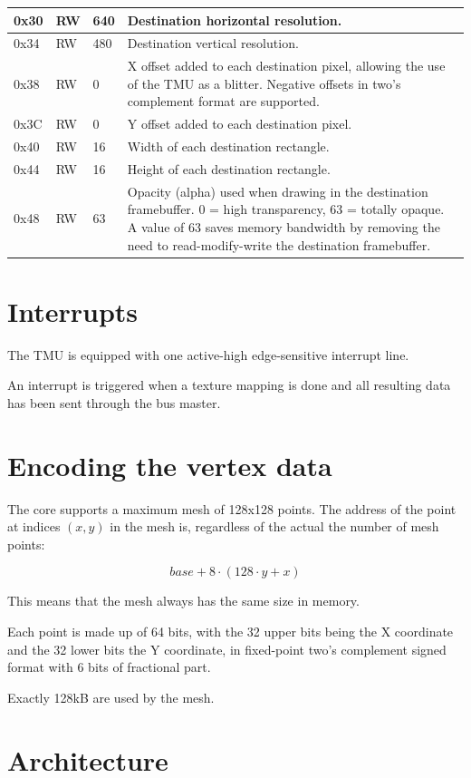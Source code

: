 \documentclass[a4paper,11pt]{article}
\begin{document}
\begin{tabularx}{\textwidth}{|l|l|l|X|}
\hline
0x30 & RW & 640 & Destination horizontal resolution. \\
\hline
0x34 & RW & 480 & Destination vertical resolution. \\
\hline
0x38 & RW & 0 & X offset added to each destination pixel, allowing the use of the TMU as a blitter. Negative offsets in two's complement format are supported. \\
\hline
0x3C & RW & 0 & Y offset added to each destination pixel. \\
\hline
0x40 & RW & 16 & Width of each destination rectangle. \\
\hline
0x44 & RW & 16 & Height of each destination rectangle. \\
\hline
0x48 & RW & 63 & Opacity (alpha) used when drawing in the destination framebuffer. 0 = high transparency, 63 = totally opaque. A value of 63 saves memory bandwidth by removing the need to read-modify-write the destination framebuffer. \\
\hline
\end{tabularx}

\section{Interrupts}
The TMU is equipped with one active-high edge-sensitive interrupt line.

An interrupt is triggered when a texture mapping is done and all resulting data has been sent through the bus master.

\section{Encoding the vertex data}
The core supports a maximum mesh of 128x128 points. The address of the point at indices $ (x, y) $ in the mesh is, regardless of the actual the number of mesh points:

\begin{equation*}
base + 8 \cdot (128 \cdot y + x)
\end{equation*}

This means that the mesh always has the same size in memory.

Each point is made up of 64 bits, with the 32 upper bits being the X coordinate and the 32 lower bits the Y coordinate, in fixed-point two's complement signed format with 6 bits of fractional part.

Exactly 128kB are used by the mesh.

\section{Architecture}
\end{document}
